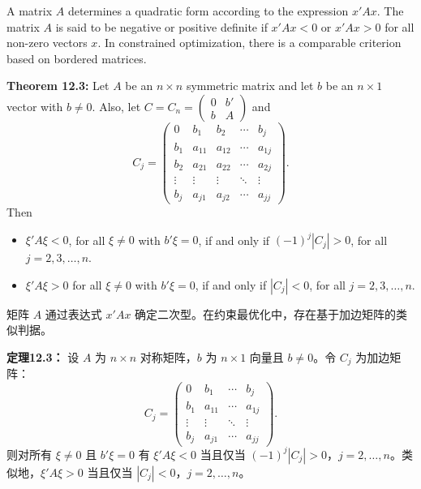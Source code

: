 \begin{original}
A matrix $A$ determines a quadratic form according to the expression $x'Ax$. The matrix $A$ is said to be negative or positive definite if $x'Ax < 0$ or $x'Ax > 0$ for all non-zero vectors $x$. In constrained optimization, there is a comparable criterion based on bordered matrices.

\textbf{Theorem 12.3:} Let $A$ be an $n \times n$ symmetric matrix and let $b$ be an $n \times 1$ vector with $b \neq 0$. Also, let $C = C_n = \begin{pmatrix} 0 & b' \\ b & A \end{pmatrix}$ and
\[
C_j = \begin{pmatrix}
0 & b_1 & b_2 & \cdots & b_j \\
b_1 & a_{11} & a_{12} & \cdots & a_{1j} \\
b_2 & a_{21} & a_{22} & \cdots & a_{2j} \\
\vdots & \vdots & \vdots & \ddots & \vdots \\
b_j & a_{j1} & a_{j2} & \cdots & a_{jj}
\end{pmatrix}.
\]
Then
\begin{itemize}
\item $\xi'A\xi < 0$, for all $\xi \neq 0$ with $b'\xi = 0$, if and only if $(-1)^j|C_j| > 0$, for all $j = 2,3,\ldots,n$.
\item $\xi'A\xi > 0$ for all $\xi \neq 0$ with $b'\xi = 0$, if and only if $|C_j| < 0$, for all $j = 2,3,\ldots,n$.
\end{itemize}
\end{original}
\begin{translation}
矩阵 $A$ 通过表达式 $x'Ax$ 确定二次型。在约束最优化中，存在基于加边矩阵的类似判据。

\textbf{定理12.3：} 设 $A$ 为 $n \times n$ 对称矩阵，$b$ 为 $n \times 1$ 向量且 $b \neq 0$。令 $C_j$ 为加边矩阵：
\[
C_j = \begin{pmatrix}
0 & b_1 & \cdots & b_j \\
b_1 & a_{11} & \cdots & a_{1j} \\
\vdots & \vdots & \ddots & \vdots \\
b_j & a_{j1} & \cdots & a_{jj}
\end{pmatrix}.
\]
则对所有 $\xi \neq 0$ 且 $b'\xi = 0$ 有 $\xi'A\xi < 0$ 当且仅当 $(-1)^j|C_j| > 0$，$j = 2,\ldots,n$。类似地，$\xi'A\xi > 0$ 当且仅当 $|C_j| < 0$，$j = 2,\ldots,n$。
\end{translation}

